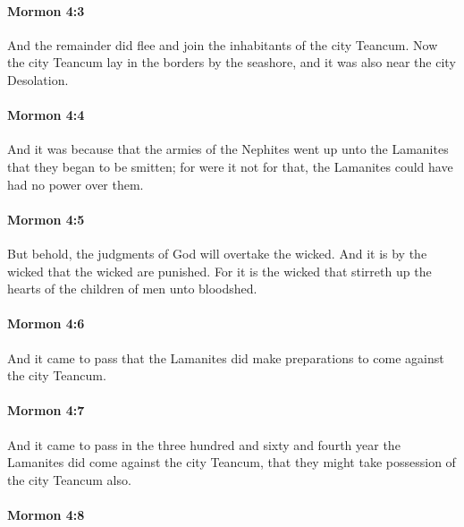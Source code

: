 		\paragraph{Mormon 4:3} %
			\label{MORMON-4-3}

			And the remainder did flee and join the inhabitants of the city Teancum.
			Now the city Teancum lay in the borders by the seashore,
			and it was also near the city Desolation.

		\paragraph{Mormon 4:4} %
			\label{MORMON-4-4}

			And it was because that the armies of the Nephites went up unto the Lamanites
			that they began to be smitten;
			for were it not for that,
			the Lamanites could have had no power over them.

		\paragraph{Mormon 4:5} %
			\label{MORMON-4-5}

			But behold, the judgments of God will overtake the wicked.
			And it is by the wicked that the wicked are punished.
			For it is the wicked
			that stirreth up the hearts of the children of men unto bloodshed.

		\paragraph{Mormon 4:6} %
			\label{MORMON-4-6}

			And it came to pass that the Lamanites did make preparations
			to come against the city Teancum.

		\paragraph{Mormon 4:7} %
			\label{MORMON-4-7}

			And it came to pass in the three hundred and sixty and fourth year
			the Lamanites did come against the city Teancum,
			that they might take possession of the city Teancum also.

		\paragraph{Mormon 4:8} %
			\label{MORMON-4-8}

